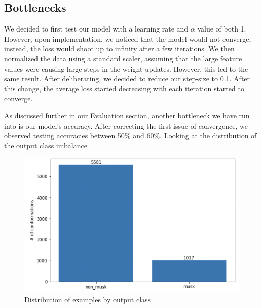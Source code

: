 \documentclass[12pt]{article}
\begin{document}
\subsection{Bottlenecks}

We decided to first test our model with a learning rate and $\alpha$ value of both 1. However, upon implementation, we noticed that the model would not converge, instead, the loss would shoot up to infinity after a few iterations. We then normalized the data using a standard scaler, assuming that the large feature values were causing large steps in the weight updates. However, this led to the same result. After deliberating, we decided to reduce our step-size to 0.1. After this change, the average loss started decreasing with each iteration started to converge.

As discussed further in our Evaluation section, another bottleneck we have run into is our model's accuracy. After correcting the first issue of convergence, we observed testing accuracies between 50\% and 60\%. Looking at the distribution of the output class imbalance

\begin{figure}[h!]
\begin{center}
  \includegraphics[scale=0.7]{images/outcome_distrib.png}
  \caption{Distribution of examples by output class}
  \label{fig:1}
\end{center}
\end{figure}
\end{document}
